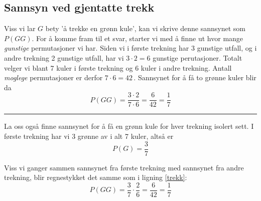 \subsection{Sannsyn ved gjentatte trekk}
 \qquad
{}
Viss vi lar $ G $ bety 'å trekke en grønn kule', kan vi skrive denne sannsynet som $ P(GG) $. For å komme fram til et svar, starter vi med å finne ut hvor mange \textsl{gunstige} permutasjoner vi har. Siden vi i første trekning har 3 gunstige utfall, og i andre trekning 2 gunstige utfall, har vi $3\cdot2=6$ gunstige perutasjoner. Totalt velger vi blant 7 kuler i første trekning og 6 kuler i andre trekning. Antall \textsl{moglege} permutasjoner er derfor $7\cdot6=42$\,. Sannsynet for å få to grønne kuler blir da
\begin{equation}
P(GG)=\frac{3\cdot2}{7\cdot6}=\frac{6}{42}=\frac{1}{7} \label{trekk}
\end{equation}
\rule{\linewidth}{1pt}
La oss også finne sannsynet for å få en grønn kule for hver trekning isolert sett. I første trekning har vi 3 grønne av i alt 7 kuler, altså er
\[ P(G)=\frac{3}{7} \]
\qquad
{}


Viss vi ganger sammen sannsynet fra første trekning med sannsynet fra andre trekning, blir regnestykket det samme som i ligning \eqref{trekk}:
\[ P(GG)=\frac{3}{7}\cdot\frac{2}{6}=\frac{6}{42}=\frac{1}{7} \]


